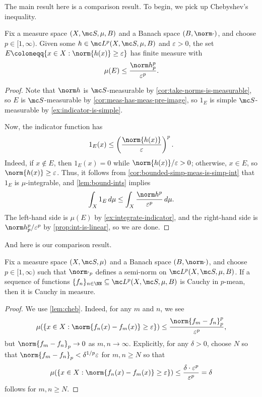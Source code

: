 \documentclass[../notes.tex]{subfiles}
\begin{document}
The main result here is a comparison result. To begin, we pick up Chebyshev's inequality.
\begin{lemma}[Chebyshev] \label{lem:cheb}
	Fix a measure space $(X,\mc S,\mu,B)$ and a Banach space $(B,\norm\cdot)$, and choose $p\in[1,\infty)$. Given some $h\in\mc L^p(X,\mc S,\mu,B)$ and $\varepsilon>0$, the set $E\coloneqq\{x\in X:\norm{h(x)}\ge\varepsilon\}$ has finite measure with
	\[\mu(E)\le\frac{\norm h_p^p}{\varepsilon^p}.\]
\end{lemma}
\begin{proof}
	Note that $\norm h$ is $\mc S$-measurable by \autoref{cor:take-norms-is-measurable}, so $E$ is $\mc S$-measurable by \autoref{cor:meas-has-meas-pre-image}, so $1_E$ is simple $\mc S$-measurable by \autoref{ex:indicator-is-simple}.
	
	Now, the indicator function has
	\[1_{E}(x)\le\left(\frac{\norm{h(x)}}\varepsilon\right)^p.\]
	Indeed, if $x\notin E$, then $1_E(x)=0$ while $\norm{h(x)}/\varepsilon>0$; otherwise, $x\in E$, so $\norm{h(x)}\ge\varepsilon$. Thus, it follows from \autoref{cor:bounded-simp-meas-is-simp-int} that $1_E$ is $\mu$-integrable, and \autoref{lem:bound-ints} implies
	\[\int_X1_E\,d\mu\le\int_X\frac{\norm h^p}{\varepsilon^p}\,d\mu.\]
	The left-hand side is $\mu(E)$ by \autoref{ex:integrate-indicator}, and the right-hand side is $\norm h_p^p/\varepsilon^p$ by \autoref{prop:int-is-linear}, so we are done.
\end{proof}
And here is our comparison result.
\begin{lemma} \label{lem:converge-in-p-mean-to-converge-in-measure}
	Fix a measure space $(X,\mc S,\mu)$ and a Banach space $(B,\norm\cdot)$, and choose $p\in[1,\infty)$ such that $\norm\cdot_p$ defines a semi-norm on $\mc L^p(X,\mc S,\mu,B)$. If a sequence of functions $\{f_n\}_{n\in\NN}\subseteq\mc L^p(X,\mc S,\mu,B)$ is Cauchy in $p$-mean, then it is Cauchy in measure.
\end{lemma}
\begin{proof}
	We use \autoref{lem:cheb}. Indeed, for any $m$ and $n$, we see
	\[\mu(\{x\in X:\norm{f_n(x)-f_m(x)}\ge\varepsilon\})\le\frac{\norm{f_m-f_n}_p^p}{\varepsilon^p},\]
	but $\norm{f_m-f_n}_p\to0$ as $m,n\to\infty$. Explicitly, for any $\delta>0$, choose $N$ so that $\norm{f_m-f_n}_p<\delta^{1/p}\varepsilon$ for $m,n\ge N$ so that
	\[\mu(\{x\in X:\norm{f_n(x)-f_m(x)}\ge\varepsilon\})\le\frac{\delta\cdot\varepsilon^p}{\varepsilon^p}=\delta\]
	follows for $m,n\ge N$.
\end{proof}
\end{document}
